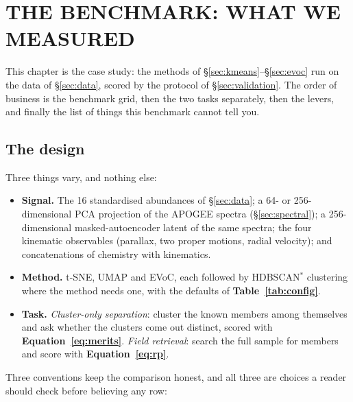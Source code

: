 \section{THE BENCHMARK: WHAT WE MEASURED}
\label{sec:benchmark}


This chapter is the case study: the methods of
\S\ref{sec:kmeans}--\S\ref{sec:evoc} run on the data of \S\ref{sec:data},
scored by the protocol of \S\ref{sec:validation}. The order of business is the
benchmark grid, then the two tasks separately, then the levers, and finally the
list of things this benchmark cannot tell you.

\subsection{The design}

Three things vary, and nothing else:

\begin{itemize}
\item \textbf{Signal.} The 16 standardised abundances of \S\ref{sec:data};
  a 64- or 256-dimensional PCA projection of the APOGEE spectra
  (\S\ref{sec:spectral}); a 256-dimensional masked-autoencoder latent of the
  same spectra; the four kinematic observables
  (parallax, two proper motions, radial velocity); and concatenations of
  chemistry with kinematics.
\item \textbf{Method.} t-SNE, UMAP and EVoC, each followed by
  HDBSCAN$^*$ clustering where the method needs one, with the defaults of
  \textbf{Table~\ref{tab:config}}.
\item \textbf{Task.} \emph{Cluster-only separation}: cluster the known members
  among themselves and ask whether the clusters come out distinct, scored with
  \textbf{Equation~\ref{eq:merits}}. \emph{Field retrieval}: search the full
  sample for members and score with \textbf{Equation~\ref{eq:rp}}.
\end{itemize}

Three conventions keep the comparison honest, and all three are choices a
reader should check before believing any row:

